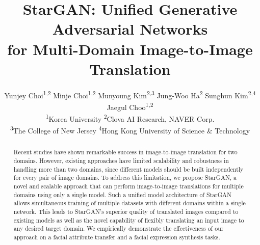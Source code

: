 \documentclass[10pt,twocolumn,letterpaper]{article}
\begin{document}
\title{StarGAN: Unified Generative Adversarial Networks \\ for Multi-Domain Image-to-Image Translation}

\author{Yunjey Choi\textsuperscript{1,2} \hspace{.04in} Minje Choi\textsuperscript{1,2} \hspace{.04in} Munyoung Kim\textsuperscript{2,3} \hspace{.04in} Jung-Woo Ha\textsuperscript{2} 
\vspace{.05in}
\hspace{.04in} Sunghun Kim\textsuperscript{2,4} \hspace{.04in} Jaegul Choo\textsuperscript{1,2}\\
\textsuperscript{1}\thinspace Korea University \hspace{.1in} \vspace{.03in}\textsuperscript{2}\thinspace Clova AI Research, NAVER Corp.\\
\textsuperscript{3}\thinspace The College of New Jersey \hspace{.1in} \textsuperscript{4}\thinspace Hong Kong University of Science \& Technology
\vspace{-.1in}
}



\begin{abstract}
\vspace{-.2in}
Recent studies have shown remarkable success in image-to-image translation for two domains. However, existing approaches have limited scalability and robustness in handling more than two domains, since different models should be built independently for every pair of image domains. To address this limitation, we propose StarGAN, a novel and scalable approach that can perform image-to-image translations for multiple domains using only a single model. Such a unified model architecture of StarGAN allows simultaneous training of multiple datasets with different domains within a single
network. This leads to StarGAN's superior quality of translated images
compared to existing models as well as the novel capability of flexibly translating an input image to any desired target domain. We empirically demonstrate the effectiveness of our approach on a facial attribute transfer and a facial expression synthesis tasks.
\end{abstract}
\end{document}
